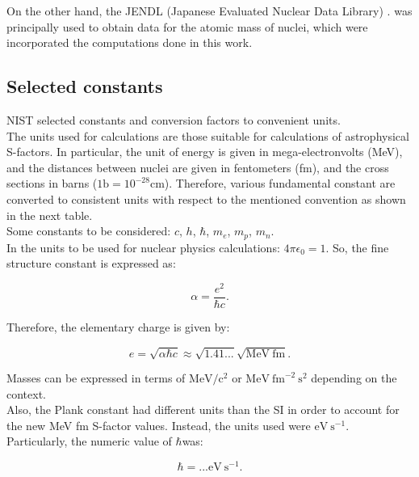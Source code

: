 \documentclass[openany]{book}
\begin{document}
On the other hand, the JENDL (Japanese Evaluated Nuclear Data Library) \cite{iwamoto_iwamoto_shibata_ichihara_kunieda_minato_nakayama_2020}. was principally used to obtain data for the atomic mass of nuclei, which were incorporated the computations done in this work. 

\subsection{Selected constants} \label{sub:selectedConstants}

NIST selected constants and conversion factors to convenient units. \\

The units used for calculations are those suitable for calculations of astrophysical S-factors. In particular, the unit of energy is given in mega-electronvolts (MeV), and the distances between nuclei are given in fentometers (fm), and the cross sections in barns ($\mathrm{1b = 10^{-28}cm}$). Therefore, various fundamental constant are converted to consistent units with respect to the mentioned convention as shown in the next table. \\

Some constants to be considered: $c$, $h$, $\hbar$, $m_e$, $m_p$, $m_n$. \\

In the units to be used for nuclear physics calculations: $4\pi\epsilon_0 = 1$. So, the fine structure constant is expressed as:

\begin{equation} \label{eq:constants_alpha}
	\alpha = \frac{e^2}{\hbar c}.
\end{equation}

Therefore, the elementary charge is given by: 

\begin{equation} \label{eq:constants_e}
	e = \sqrt{\alpha\hbar c} \approx \sqrt{1.41...} \sqrt{\mathrm{MeV \ fm}}.
\end{equation}

Masses can be expressed in terms of $\mathrm{MeV/c^2}$ or $\mathrm{MeV \ {fm}^{-2} \ s^{2}}$ depending on the context.  \\ 

Also, the Plank constant had different units than the SI in order to account for the new MeV fm S-factor values. Instead, the units used were $\mathrm{eV \ {s}^{-1}}$. Particularly, the numeric value of $\hbar $was:

\begin{equation} \label{eq:constants_hbar}
	\hbar  =  ...  \mathrm{eV \ {s}^{-1}}.
\end{equation}
\end{document}
